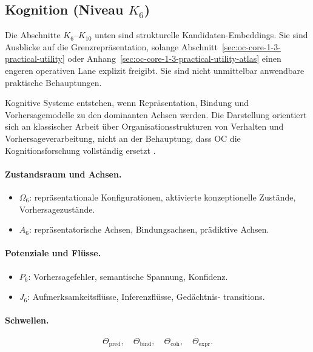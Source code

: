 \subsection{Kognition (Niveau \texorpdfstring{$K_6$}{K6})}

Die Abschnitte \(K_6\)--\(K_{10}\) unten sind strukturelle
Kandidaten-Embeddings.
Sie sind Ausblicke auf die Grenzrepräsentation, solange
Abschnitt~\ref{sec:oc-core-1-3-practical-utility} oder
Anhang~\ref{sec:oc-core-1-3-practical-utility-atlas} einen engeren operativen
Lane explizit freigibt. Sie sind nicht unmittelbar anwendbare praktische
Behauptungen.

Kognitive Systeme entstehen, wenn Repräsentation, Bindung und Vorhersagemodelle
zu den dominanten Achsen werden.
Die Darstellung orientiert sich an klassischer Arbeit über Organisationsstrukturen
von Verhalten und Vorhersageverarbeitung, nicht an der Behauptung, dass OC die
Kognitionsforschung vollständig ersetzt
\parencite{hebb_organization,friston_free_energy}.

\paragraph{Zustandsraum und Achsen.}
\begin{itemize}
  \item \(\Omega_6\): repräsentationale Konfigurationen, aktivierte
        konzeptionelle Zustände, Vorhersagezustände.
  \item \(A_6\): repräsentatorische Achsen, Bindungsachsen,
        prädiktive Achsen.
\end{itemize}

\paragraph{Potenziale und Flüsse.}
\begin{itemize}
  \item \(P_6\): Vorhersagefehler, semantische Spannung, Konfidenz.
  \item \(J_6\): Aufmerksamkeitsflüsse, Inferenzflüsse, Gedächtnis-
        transitions.
\end{itemize}

\paragraph{Schwellen.}
\[
  \Theta_{\mathrm{pred}},\quad
  \Theta_{\mathrm{bind}},\quad
  \Theta_{\mathrm{coh}},\quad
  \Theta_{\mathrm{expr}}.
\]

